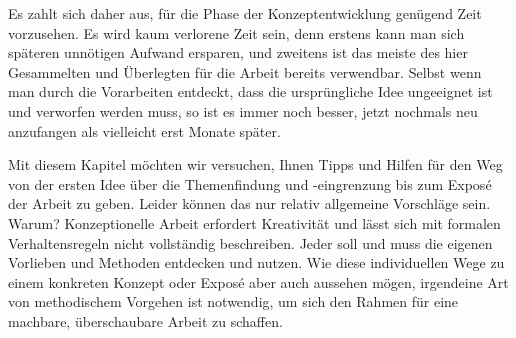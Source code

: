 \documentclass[]{book}
\theoremstyle{definition}
\theoremstyle{definition}
\theoremstyle{definition}
\theoremstyle{remark}
\begin{document}
Es zahlt sich daher aus, für die Phase der Konzeptentwicklung genügend
Zeit vorzusehen. Es wird kaum verlorene Zeit sein, denn erstens kann man
sich späteren unnötigen Aufwand ersparen, und zweitens ist das meiste
des hier Gesammelten und Überlegten für die Arbeit bereits verwendbar.
Selbst wenn man durch die Vorarbeiten entdeckt, dass die ursprüngliche
Idee ungeeignet ist und verworfen werden muss, so ist es immer noch
besser, jetzt nochmals neu anzufangen als vielleicht erst Monate später.

Mit diesem Kapitel möchten wir versuchen, Ihnen Tipps und Hilfen für den
Weg von der ersten Idee über die Themenfindung und -eingrenzung bis zum
Exposé der Arbeit zu geben. Leider können das nur relativ allgemeine
Vorschläge sein. Warum? Konzeptionelle Arbeit erfordert Kreativität und
lässt sich mit formalen Verhaltensregeln nicht vollständig beschreiben.
Jeder soll und muss die eigenen Vorlieben und Methoden entdecken und
nutzen. Wie diese individuellen Wege zu einem konkreten Konzept oder
Exposé aber auch aussehen mögen, irgendeine Art von methodischem
Vorgehen ist notwendig, um sich den Rahmen für eine machbare,
überschaubare Arbeit zu schaffen.
\end{document}
